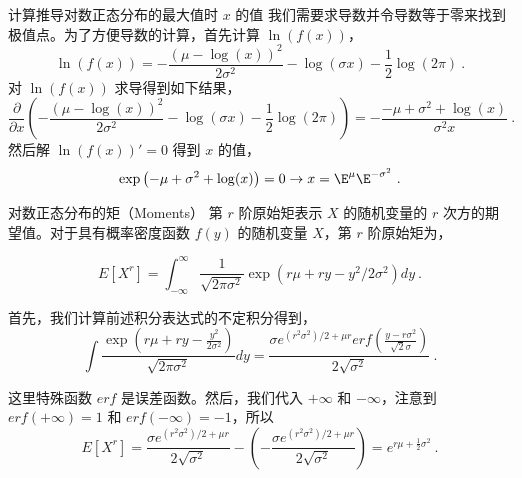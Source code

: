 \begin{example}{计算推导对数正态分布的最大值时 \( x \) 的值}
我们需要求导数并令导数等于零来找到极值点。为了方便导数的计算，首先计算 $\ln(f(x))$，
\begin{equation}
    \ln(f(x)) = -\frac{(\mu-\log (x))^2}{2 \sigma^2}-\log (\sigma x)-\frac{1}{2} \log (2 \pi)~.
\end{equation}
对 $\ln(f(x))$ 求导得到如下结果，
\begin{equation}
\frac{\partial}{\partial x}\left(-\frac{(\mu-\log (x))^2}{2 \sigma^2}-\log (\sigma x)-\frac{1}{2} \log (2 \pi)\right) = -\frac{-\mu+\sigma^2+\log (x)}{\sigma^2 x}~.
\end{equation}
然后解 $\ln(f(x))'=0$ 得到 $x$ 的值，
\begin{equation}
    \exp \left({-\mu+\sigma^2+\log (x)}\right) = 0 \rightarrow x = \E^{\mu}\E^{-\sigma^2}~.
\end{equation}
\end{example}
\begin{example}{对数正态分布的矩（Moments）}
第 $r$ 阶原始矩表示 $X$ 的随机变量的 $r$ 次方的期望值。对于具有概率密度函数 $f(y)$ 的随机变量 $X$，第 $r$ 阶原始矩为，

\begin{equation}
E\left[X^r\right]=\int_{-\infty}^{\infty} \frac{1}{\sqrt{2 \pi \sigma^2}} \exp \left(r \mu+r y-y^2 / 2 \sigma^2\right)dy ~.
\end{equation}

首先，我们计算前述积分表达式的不定积分得到，
\begin{equation}
\int \frac{\exp \left(r \mu+r y-\frac{y^2}{2 \sigma^2}\right)}{\sqrt{2 \pi \sigma^2}} d y=\frac{\sigma e^{\left(r^2 \sigma^2\right) / 2+\mu r} erf\left(\frac{y-r \sigma^2}{\sqrt{2} \sigma}\right)}{2 \sqrt{\sigma^2}}~.
\end{equation}

这里特殊函数 $erf$ 是误差函数。然后，我们代入 $+\infty$ 和 $-\infty$，注意到 $erf(+\infty)=1$ 和 $erf(-\infty)=-1$，所以
\begin{equation}
E\left[X^r\right]=\frac{\sigma e^{\left(r^2 \sigma^2\right) / 2+\mu r}}{2 \sqrt{\sigma^2}}-\left(-\frac{\sigma e^{\left(r^2 \sigma^2\right) / 2+\mu r}}{2 \sqrt{\sigma^2}}\right) = e^{r\mu+\frac{1}{2}\sigma^2}~.
\end{equation}

\end{example}